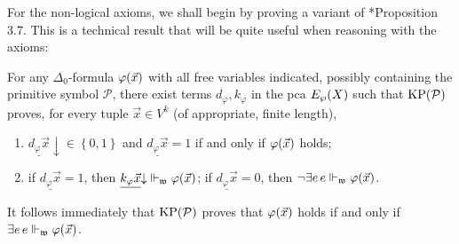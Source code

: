 \documentclass[12pt,openany]{book}
\theoremstyle{plain}
\theoremstyle{definition}
\newcommand\uppar[1]{{\upshape(}#1{\upshape)}}
\newcommand\uplabel[1]{\textup{(#1)}}
\newcommand\opE[1]{\mathop{\exists #1}}
\newcommand\Pow{\mathcal{P}}
\newcommand\KPP{\mathrm{KP}\mleft(\Pow\mright)}
\begin{document}
For the non-logical axioms, we shall begin by proving a variant of \cite{rathjen12-czf-powerset}*{Proposition 3.7}. This is a technical result that will be quite useful when reasoning with the axioms:
\begin{proposition}
  \label{prop:ep-real-delta0-correctness}
  For any $\Delta_0$-formula $\varphi\mleft(\vec{x}\mright)$ with all free variables indicated, possibly containing the primitive symbol $\Pow$, there exist terms $d_\varphi, k_\varphi$ in the pca $E_\wp\mleft(X\mright)$ such that $\KPP$ proves, for every tuple $\vec{x} \in V^k$ \uppar{of appropriate, finite length},
  \begin{enumerate}[label=\uplabel{\roman*}]
    \item $\underline{d_\varphi \vec{x}} {\downarrow} \in \left\{0, 1\right\}$ and $\underline{d_\varphi \vec{x}} = 1$ if and only if $\varphi\mleft(\vec{x}\mright)$ holds;
    \item if $\underline{d_\varphi \vec{x}} = 1$, then $\underline{k_\varphi \vec{x}} {\downarrow} \Vdash_\mathfrak{w} \varphi\mleft(\vec{x}\mright)$; if $\underline{d_\varphi \vec{x}} = 0$, then $\neg\!\opE{e} e \Vdash_\mathfrak{w} \varphi\mleft(\vec{x}\mright)$.
  \end{enumerate}

  It follows immediately that $\KPP$ proves that $\varphi\mleft(\vec{x}\mright)$ holds if and only if $\opE{e} e \Vdash_\mathfrak{w} \varphi\mleft(\vec{x}\mright)$.
\end{proposition}
\end{document}
